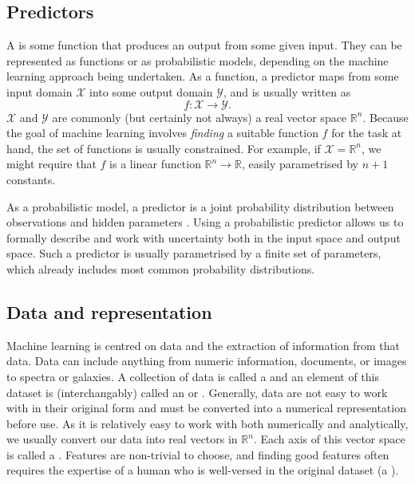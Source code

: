     \subsection{Predictors}
    \label{sec:predictors}

        A  is some function that produces an output from some given input. They can be represented as functions or as probabilistic models, depending on the machine learning approach being undertaken. As a function, a predictor maps from some input domain $\mathcal X$ into some output domain $\mathcal Y$, and is usually written as
        \begin{equation}
            f : \mathcal X \to \mathcal Y.
        \end{equation}
        $\mathcal X$ and $\mathcal Y$ are commonly (but certainly not always) a real vector space $\mathbb R^n$. Because the goal of machine learning involves \emph{finding} a suitable function $f$ for the task at hand, the set of functions is usually constrained. For example, if $\mathcal X = \mathbb{R}^n$, we might require that $f$ is a linear function $\mathbb R^n \to \mathbb R$, easily parametrised by $n + 1$ constants.

        As a probabilistic model, a predictor is a joint probability distribution between observations and hidden parameters \citep{deisenroth_mathematics_2020}. Using a probabilistic predictor allows us to formally describe and work with uncertainty both in the input space and output space. Such a predictor is usually parametrised by a finite set of parameters, which already includes most common probability distributions.

    \subsection{Data and representation}
    \label{sec:data-and-representation}

        Machine learning is centred on data and the extraction of information from that data. Data can include anything from numeric information, documents, or images to spectra or galaxies. A collection of data is called a  and an element of this dataset is (interchangably) called an  or . Generally, data are not easy to work with in their original form and must be converted into a numerical representation before use. As it is relatively easy to work with both numerically and analytically, we usually convert our data into real vectors in $\mathbb R^n$. Each axis of this vector space is called a . Features are non-trivial to choose, and finding good features often requires the expertise of a human who is well-versed in the original dataset (a ).

